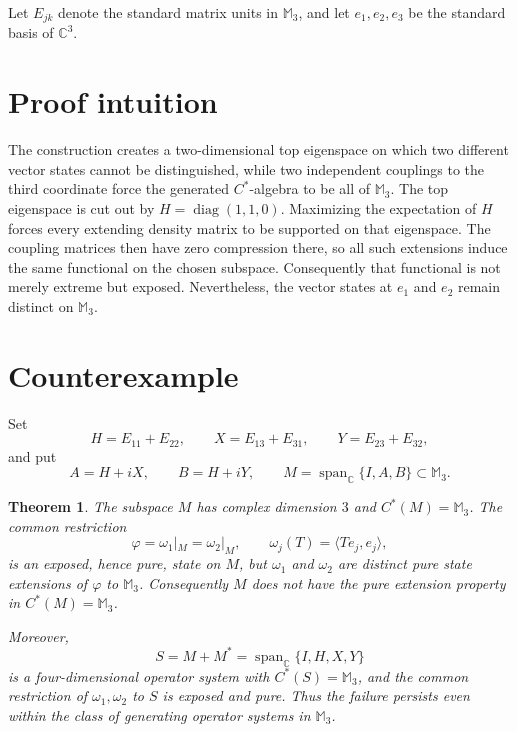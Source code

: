 \documentclass[11pt]{article}
\newtheorem{theorem}{Theorem}
\newcommand{\Mthree}{\mathbb M_3}
\newcommand{\Cstar}{C^*}
\DeclareMathOperator{\spanop}{span}
\begin{document}
Let \(E_{jk}\) denote the standard matrix units in \(\Mthree\), and let
\(e_1,e_2,e_3\) be the standard basis of \(\mathbb C^3\).

\section*{Proof intuition}

The construction creates a two-dimensional top eigenspace on which two
different vector states cannot be distinguished, while two independent
couplings to the third coordinate force the generated \(C^*\)-algebra to be
all of \(\Mthree\).  The top eigenspace is cut out by
\(H=\operatorname{diag}(1,1,0)\).  Maximizing the expectation of \(H\)
forces every extending density matrix to be supported on that eigenspace.
The coupling matrices then have zero compression there, so all such
extensions induce the same functional on the chosen subspace.  Consequently
that functional is not merely extreme but exposed.  Nevertheless, the
vector states at \(e_1\) and \(e_2\) remain distinct on \(\Mthree\).

\section*{Counterexample}

Set
\[
 H=E_{11}+E_{22},\qquad
 X=E_{13}+E_{31},\qquad
 Y=E_{23}+E_{32},
\]
and put
\[
 A=H+iX,\qquad B=H+iY,\qquad
 M=\spanop_{\mathbb C}\{I,A,B\}\subset\Mthree .
\]

\begin{theorem}\label{thm:main}
The subspace \(M\) has complex dimension \(3\) and
\(\Cstar(M)=\Mthree\).  The common restriction
\[
 \varphi=\omega_1|_M=\omega_2|_M,\qquad
 \omega_j(T)=\langle Te_j,e_j\rangle,
\]
is an exposed, hence pure, state on \(M\), but \(\omega_1\) and \(\omega_2\)
are distinct pure state extensions of \(\varphi\) to \(\Mthree\).
Consequently \(M\) does not have the pure extension property in
\(\Cstar(M)=\Mthree\).

Moreover,
\[
 S=M+M^*=\spanop_{\mathbb C}\{I,H,X,Y\}
\]
is a four-dimensional operator system with \(\Cstar(S)=\Mthree\), and the
common restriction of \(\omega_1,\omega_2\) to \(S\) is exposed and pure.
Thus the failure persists even within the class of generating operator
systems in \(\Mthree\).
\end{theorem}
\end{document}
